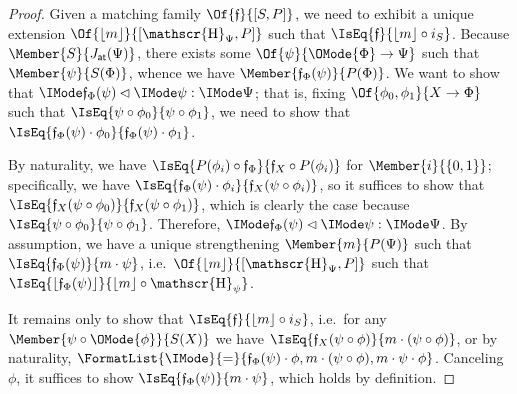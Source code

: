 \documentclass{article}
\DeclareMathOperator\OpYoneda{\mathscr{H}}
\newcommand\Yoneda[1]{\OpYoneda_{#1}}
\newcommand\AreEq[1]{\FormatList{\IMode}{=}{#1}}
\newcommand\JAtomic{J_{\mathsf{at}}}
\newcommand\Emb[1]{\lfloor{#1}\rfloor}
\begin{document}
\begin{proof}
  Given a matching family $\Of{\mathfrak{f}}{[S,P]}$, we need to
  exhibit a unique extension $\Of{\Emb{m}}{[\Yoneda{\Psi},P]}$ such
  that $\IsEq{\mathfrak{f}}{\Emb{m}\circ i_S}$. Because
  $\Member{S}{\JAtomic(\Psi)}$, there exists some
  $\Of{\psi}{\OMode{\Phi}\to\Psi}$ such that $\Member{\psi}{S(\Phi)}$,
  whence we have $\Member{\mathfrak{f}_\Phi(\psi)}{P(\Phi)}$.
  We want to show that
  $\Supports{\Psi}{\psi}{\mathfrak{f}_\Phi(\psi)}$; that is, fixing
  $\Of{\phi_0,\phi_1}{X\to\Phi}$ such that
  $\IsEq{\psi\circ\phi_0}{\psi\circ\phi_1}$, we need to show that
  $\IsEq{\mathfrak{f}_\Phi(\psi)\cdot\phi_0}{\mathfrak{f}_\Phi(\psi)\cdot\phi_1}$.

  By naturality, we have
  $\IsEq{P(\phi_i)\circ\mathfrak{f}_\Phi}{\mathfrak{f}_X\circ
    P(\phi_i)}$ for $\Member{i}{\MkSet{0,1}}$; specifically, we have
  $\IsEq{\mathfrak{f}_\Phi(\psi) \cdot
    \phi_i}{\mathfrak{f}_X(\psi\circ\phi_i)}$, so it suffices to show
  that
  $\IsEq{\mathfrak{f}_X(\psi\circ\phi_0)}{\mathfrak{f}_X(\psi\circ\phi_1)}$,
  which is clearly the case because
  $\IsEq{\psi\circ\phi_0}{\psi\circ\phi_1}$. Therefore,
  $\Supports{\Psi}{\psi}{\mathfrak{f}_\Phi(\psi)}$.
  By assumption, we have a unique strengthening $\Member{m}{P(\Psi)}$
  such that $\IsEq{\mathfrak{f}_\Phi(\psi)}{m\cdot\psi}$, i.e.\
  $\Of{\Emb{m}}{[\Yoneda{\Psi},P]}$ such that
  $\IsEq{\Emb{\mathfrak{f}_\Phi(\psi)}}{\Emb{m}\circ\Yoneda{\psi}}$.

  It remains only to show that
  $\IsEq{\mathfrak{f}}{\Emb{m}\circ i_S}$, i.e.\ for any
  $\Member{\psi\circ\OMode{\phi}}{S(X)}$ we have
  $\IsEq{\mathfrak{f}_X(\psi\circ\phi)}{m\cdot(\psi\circ\phi)}$, or by
  naturality,
  $\AreEq{\mathfrak{f}_\Phi(\psi)\cdot\phi,m\cdot(\psi\circ\phi),m\cdot\psi\cdot\phi}$. Canceling
  $\phi$, it suffices to show
  $\IsEq{\mathfrak{f}_\Phi(\psi)}{m\cdot\psi}$, which holds by
  definition.

\end{proof}


\newcommand\ForcesOf[3]{\IMode{#1}\Vdash\IMode{#2}:\IMode{#3}}

\newpage



\end{document}
